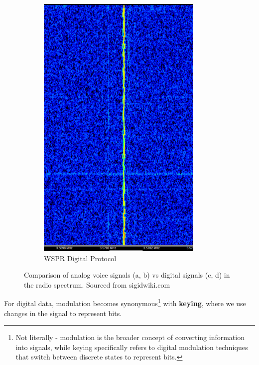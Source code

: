 \begin{figure}[h]
\begin{subfigure}[b]{0.2\textwidth}
        \includegraphics[width=\textwidth]{assets/osi/physical/signals/wspr.png}
        \caption{WSPR Digital Protocol}
        \label{fig:wspr_digital}
    \end{subfigure}
    
    \caption{Comparison of analog voice signals (a, b) vs digital signals (c, d) in the radio spectrum. Sourced from sigidwiki.com}
    \label{fig:analog_vs_digital_signals}
\end{figure}

\newpage
For digital data, modulation becomes synonymous\footnote{
    Not literally - modulation is the broader concept of converting information into signals, while keying specifically refers to digital modulation techniques that switch between discrete states to represent bits.
    } with \textbf{keying}, where we use changes in the signal to represent bits.


